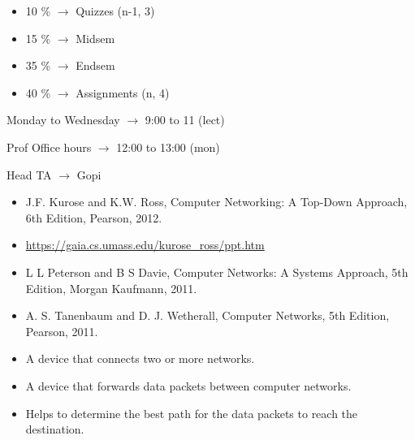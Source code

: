 \documentclass[a4paper, twoside]{report}
\author{Dev M.}
\date{07/08/2023}
\begin{document}


\begin{itemize}
    \item 10 \% $\rightarrow$ Quizzes (n-1, 3)
    \item 15 \% $\rightarrow$ Midsem
    \item 35 \% $\rightarrow$ Endsem
    \item 40 \% $\rightarrow$ Assignments (n, 4)
\end{itemize}


Monday to Wednesday $\rightarrow$ 9:00 to 11 (lect)

Prof Office hours  $\rightarrow$ 12:00 to 13:00 (mon)

Head TA $\rightarrow$ Gopi

\begin{itemize}
    \item J.F. Kurose and K.W. Ross, Computer Networking: A Top-Down Approach, 6th Edition, Pearson, 2012.
    \item \url{https://gaia.cs.umass.edu/kurose_ross/ppt.htm}
    \item L L Peterson and B S Davie, Computer Networks: A Systems Approach, 5th Edition, Morgan Kaufmann, 2011.
    \item  A. S. Tanenbaum and D. J. Wetherall, Computer Networks, 5th Edition, Pearson, 2011.
\end{itemize}




\begin{itemize}
    \item A device that connects two or more networks.
    \item A device that forwards data packets between computer networks.
    \item Helps to determine the best path for the data packets to reach the destination.
\end{itemize}
\end{document}

